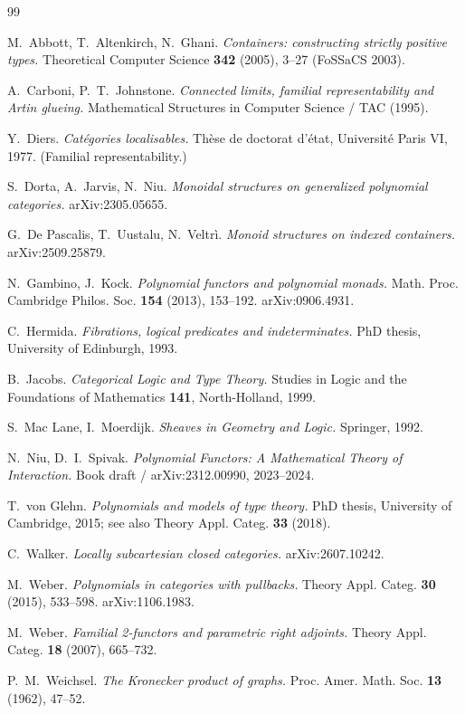 \documentclass[11pt]{article}
\theoremstyle{plain}
\theoremstyle{definition}
\theoremstyle{remark}
\begin{document}
\begin{thebibliography}{99}

 M.~Abbott, T.~Altenkirch, N.~Ghani.
\emph{Containers: constructing strictly positive types.}
Theoretical Computer Science \textbf{342} (2005), 3--27 (FoSSaCS 2003).

 A.~Carboni, P.~T.~Johnstone.
\emph{Connected limits, familial representability and Artin glueing.}
Mathematical Structures in Computer Science / TAC (1995).

 Y.~Diers.
\emph{Cat\'egories localisables.}
Th\`ese de doctorat d'\'etat, Universit\'e Paris VI, 1977. (Familial representability.)

 S.~Dorta, A.~Jarvis, N.~Niu.
\emph{Monoidal structures on generalized polynomial categories.}
arXiv:2305.05655.

 G.~De Pascalis, T.~Uustalu, N.~Veltr\`i.
\emph{Monoid structures on indexed containers.}
arXiv:2509.25879.

 N.~Gambino, J.~Kock.
\emph{Polynomial functors and polynomial monads.}
Math. Proc. Cambridge Philos. Soc. \textbf{154} (2013), 153--192. arXiv:0906.4931.

 C.~Hermida.
\emph{Fibrations, logical predicates and indeterminates.}
PhD thesis, University of Edinburgh, 1993.

 B.~Jacobs.
\emph{Categorical Logic and Type Theory.}
Studies in Logic and the Foundations of Mathematics \textbf{141}, North-Holland, 1999.

 S.~Mac Lane, I.~Moerdijk.
\emph{Sheaves in Geometry and Logic.} Springer, 1992.

 N.~Niu, D.~I.~Spivak.
\emph{Polynomial Functors: A Mathematical Theory of Interaction.}
Book draft / arXiv:2312.00990, 2023--2024.

 T.~von Glehn.
\emph{Polynomials and models of type theory.}
PhD thesis, University of Cambridge, 2015; see also Theory Appl. Categ. \textbf{33} (2018).

 C.~Walker.
\emph{Locally subcartesian closed categories.}
arXiv:2607.10242.

 M.~Weber.
\emph{Polynomials in categories with pullbacks.}
Theory Appl. Categ. \textbf{30} (2015), 533--598. arXiv:1106.1983.

 M.~Weber.
\emph{Familial 2-functors and parametric right adjoints.}
Theory Appl. Categ. \textbf{18} (2007), 665--732.

 P.~M.~Weichsel.
\emph{The Kronecker product of graphs.}
Proc. Amer. Math. Soc. \textbf{13} (1962), 47--52.

\end{thebibliography}
\end{document}
